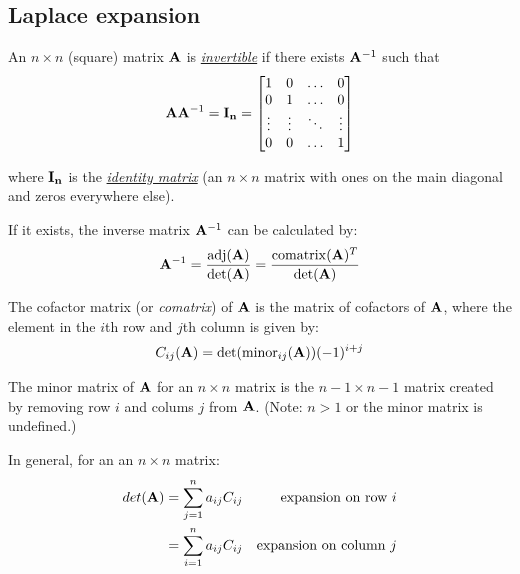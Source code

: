 \documentclass{article}%
\begin{document}
\begin{multicols}{2}
\section{Laplace expansion}
\label{Laplaceexpansion}
An $n \times n$ (square) matrix $\mathbf{A}$ is {\em \href{https://en.wikipedia.org/wiki/Invertible_matrix}{invertible}} if there exists $\mathbf{A}^{-1}$ such that
\begin{gather}
\mathbf{A}\mathbf{A}^{-1} = \mathbf{I_{n}} = \begin{bmatrix} 1&0&\dots&0 \\ 0&1&\dots&0 \\ \vdots&\vdots&\ddots&\vdots \\ 0&0&\dots&1\end{bmatrix}
\end{gather}

where $\mathbf{I_{n}}$ is the {\em\href{https://en.wikipedia.org/wiki/Identity_matrix}{identity matrix}} (an $n \times n$ matrix with ones on the main diagonal and zeros everywhere else).

If it exists, the inverse matrix $\mathbf{A}^{-1}$ can be calculated by:
\begin{gather}
\mathbf{A}^{-1} = \frac{\operatorname{adj}(\mathbf{A})}{\det(\mathbf{A})} = \frac{\operatorname{comatrix}(\mathbf{A})^T}{\det(\mathbf{A})} \label{ainv}
\end{gather}

The cofactor matrix (or {\em comatrix}) of $\mathbf{A}$ is the matrix of cofactors of $\mathbf{A}$, where the element in the $i$th row and $j$th column is given by:
\begin{gather}
C_{ij}(\mathbf{A}) = \det(\operatorname{minor}_{ij}(\mathbf{A})) ( -1 )^{i + j} 
\end{gather}

The minor matrix of $\mathbf{A}$ for an $n \times n$ matrix is the $n - 1 \times n - 1$ matrix created by removing row $i$ and colums $j$ from $\mathbf{A}$. (Note: $n > 1$ or the minor matrix is undefined.)

In general, for an an $n \times n$ matrix:
\begin{align}
det(\mathbf{A}) &= \sum_{j = 1}^{n} a_{ij} C_{ij} &\text{expansion on row $i$} \label{detgenerali} \\
  &= \sum_{i = 1}^{n} a_{ij} C_{ij} &\text{expansion on column $j$} \label{detgeneralj} 
\end{align}


\end{multicols}
\end{document}
